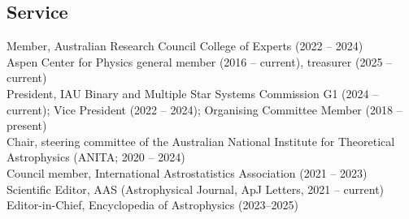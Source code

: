 \documentclass[margin,line]{res}
\begin{document}
\begin{resume}
\section{\sc Service}

Member, Australian Research Council College of Experts (2022 -- 2024)\\
Aspen Center for Physics general member (2016 -- current), treasurer (2025 -- current)\\
President, IAU Binary and Multiple Star Systems Commission G1 (2024 -- current); Vice President (2022 -- 2024); Organising Committee Member (2018 -- present)\\
Chair, steering committee of the Australian National Institute for Theoretical Astrophysics (ANITA; 2020 -- 2024)\\
Council member, International Astrostatistics Association (2021 -- 2023)\\
Scientific Editor, AAS (Astrophysical Journal, ApJ Letters, 2021 -- current)\\
Editor-in-Chief, Encyclopedia of Astrophysics (2023--2025)\\

\end{resume}
\end{document}
